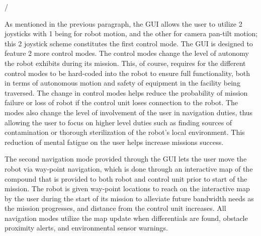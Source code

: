 /%

As mentioned in the previous paragraph, the GUI allows the user to utilize 2 joysticks with 1 being for robot motion, and the other for camera pan-tilt motion; this 2 joystick scheme constitutes the first control mode. The GUI is designed to feature 2 more control modes. The control modes change the level of autonomy the robot exhibits during its mission. This, of course, requires for the different control modes to be hard-coded into the robot to ensure full functionality, both in terms of autonomous motion and safety of equipment in the facility being traversed. The change in control modes helps reduce the probability of mission failure or loss of robot if the control unit loses connection to the robot. The modes also change the level of involvement of the user in navigation duties, thus allowing the user to focus on higher level duties such as finding sources of contamination or thorough sterilization of the robot's local environment. This reduction of mental fatigue on the user helps increase missions success. 

The second navigation mode provided through the GUI lets the user move the robot via way-point navigation, which is done through an interactive map of the compound that is provided to both robot and control unit prior to start of the mission. The robot is given way-point locations to reach on the interactive map by the user during the start of its mission to alleviate future bandwidth needs as the mission progresses, and distance from the control unit increases. All navigation modes utilize the map update when differentials are found, obstacle proximity alerts, and environmental sensor warnings.    